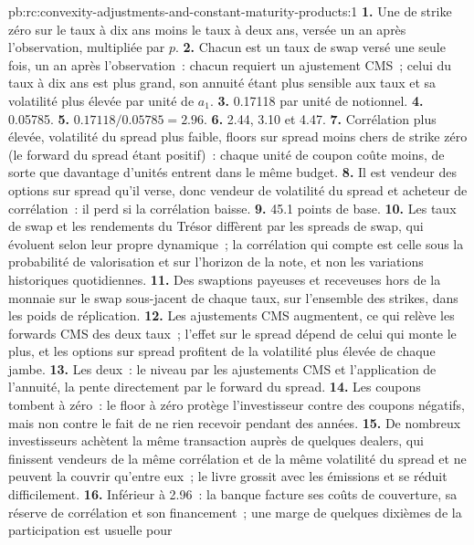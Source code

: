 \begin{solution}{pb:rc:convexity-adjustments-and-constant-maturity-products:1}
\textbf{1.} Une  de strike zéro sur le taux à dix ans moins le taux à deux ans,
versée un an après l'observation, multipliée par $p$.
\textbf{2.} Chacun est un taux de swap versé une seule fois, un an après l'observation~: chacun
requiert un ajustement CMS~; celui du taux à dix ans est plus grand, son annuité étant plus
sensible aux taux et sa volatilité plus élevée par unité de $a_1$.
\textbf{3.} 0.17118 par unité de notionnel.
\textbf{4.} 0.05785.
\textbf{5.} $0.17118/0.05785 = 2.96$.
\textbf{6.} 2.44, 3.10 et 4.47.
\textbf{7.} Corrélation plus élevée, volatilité du spread plus faible, floors sur spread moins chers
de strike zéro (le forward du spread étant positif)~: chaque unité de coupon
coûte moins, de sorte que davantage d'unités entrent dans le même budget.
\textbf{8.} Il est vendeur des options sur spread qu'il verse, donc vendeur de volatilité du spread et
acheteur de corrélation~: il perd si la corrélation baisse.
\textbf{9.} 45.1 points de base.
\textbf{10.} Les taux de swap et les rendements du Trésor diffèrent par les spreads de swap, qui évoluent
selon leur propre dynamique~; la corrélation qui compte est celle sous la probabilité de valorisation
et sur l'horizon de la note, et non les variations historiques quotidiennes.
\textbf{11.} Des swaptions payeuses et receveuses hors de la monnaie sur le swap sous-jacent de chaque
taux, sur l'ensemble des strikes, dans les poids de réplication.
\textbf{12.} Les ajustements CMS augmentent, ce qui relève les forwards CMS des deux taux~; l'effet
sur le spread dépend de celui qui monte le plus, et les options sur spread profitent
de la volatilité plus élevée de chaque jambe.
\textbf{13.} Les deux~: le niveau par les ajustements CMS et l'application de l'annuité,
la pente directement par le forward du spread.
\textbf{14.} Les coupons tombent à zéro~: le floor à zéro protège l'investisseur contre
des coupons négatifs, mais non contre le fait de ne rien recevoir pendant des années.
\textbf{15.} De nombreux investisseurs achètent la même transaction auprès de quelques dealers, qui finissent vendeurs
de la même corrélation et de la même volatilité du spread et ne peuvent la couvrir
qu'entre eux~; le livre grossit avec les émissions et se réduit difficilement.
\textbf{16.} Inférieur à 2.96~: la banque facture ses coûts de couverture, sa réserve de corrélation
et son financement~; une marge de quelques dixièmes de la participation est usuelle pour

\end{solution}
